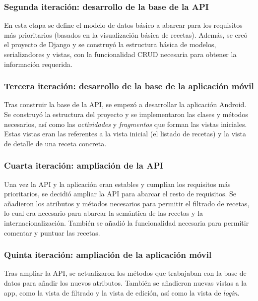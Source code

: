 \documentclass[a4paper,12pt]{article}
\begin{document}
\subsubsection{Segunda iteración: desarrollo de la base de la API}
\label{sec:segunda_iteracion}

En esta etapa se define el modelo de datos básico a abarcar para los requisitos
más prioritarios (basados en la visualización básica de recetas). Además, se
creó el proyecto de Django y se construyó la estructura básica de modelos,
serializadores y vistas, con la funcionalidad CRUD necesaria para obtener la
información requerida.


\subsubsection{Tercera iteración: desarrollo de la base de la aplicación móvil}
\label{sec:tercera_iteracion}

Tras construir la base de la API, se empezó a desarrollar la aplicación Android.
Se construyó la estructura del proyecto y se implementaron las clases y métodos
necesarios, así como las \textit{actividades} y \textit{fragmentos} que forman
las vistas iniciales. Estas vistas eran las referentes a la vista inicial (el
listado de recetas) y la vista de detalle de una receta concreta.


\subsubsection{Cuarta iteración: ampliación de la API}
\label{sec:cuarta_iteracion}

Una vez la API y la aplicación eran estables y cumplían los requisitos más
prioritarios, se decidió ampliar la API para abarcar el resto de requisitos. Se
añadieron los atributos y métodos necesarios para permitir el filtrado de
recetas, lo cual era necesario para abarcar la semántica de las recetas y la
internacionalización. También se añadió la funcionalidad necesaria para permitir
comentar y puntuar las recetas.


\subsubsection{Quinta iteración: ampliación de la aplicación móvil}
\label{sec:quinta_iteracion}

Tras ampliar la API, se actualizaron los métodos que trabajaban con la base de
datos para añadir los nuevos atributos. También se añadieron nuevas vistas a la
app, como la vista de filtrado y la vista de edición, así
como la vista de \textit{login}.
\end{document}
